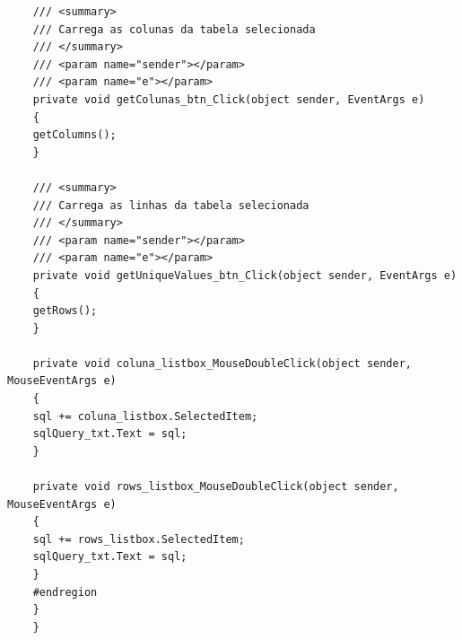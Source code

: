 \begin{lstlisting}
	/// <summary>
	/// Carrega as colunas da tabela selecionada
	/// </summary>
	/// <param name="sender"></param>
	/// <param name="e"></param>
	private void getColunas_btn_Click(object sender, EventArgs e)
	{
	getColumns();
	}
	
	/// <summary>
	/// Carrega as linhas da tabela selecionada
	/// </summary>
	/// <param name="sender"></param>
	/// <param name="e"></param>
	private void getUniqueValues_btn_Click(object sender, EventArgs e)
	{
	getRows();
	}
	
	private void coluna_listbox_MouseDoubleClick(object sender, MouseEventArgs e)
	{
	sql += coluna_listbox.SelectedItem;
	sqlQuery_txt.Text = sql;
	}
	
	private void rows_listbox_MouseDoubleClick(object sender, MouseEventArgs e)
	{
	sql += rows_listbox.SelectedItem;
	sqlQuery_txt.Text = sql;
	}
	#endregion
	}
	}
\end{lstlisting}